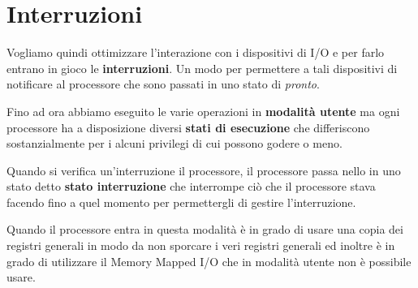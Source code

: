 \section{Interruzioni}
Vogliamo quindi ottimizzare l'interazione con i dispositivi di I/O e per farlo entrano in gioco le
\textbf{interruzioni}. Un modo per permettere a tali dispositivi di notificare al processore che
sono passati in uno stato di \emph{pronto}.

Fino ad ora abbiamo eseguito le varie operazioni in \textbf{modalità utente} ma ogni processore ha
a disposizione diversi \textbf{stati di esecuzione} che differiscono sostanzialmente per i alcuni
privilegi di cui possono godere o meno.

Quando si verifica un'interruzione il processore, il processore passa nello in uno stato detto
\textbf{stato interruzione} che interrompe ciò che il processore stava facendo fino a quel momento
per permettergli di gestire l'interruzione.

Quando il processore entra in questa modalità è in grado di usare una copia dei registri generali
in modo da non sporcare i veri registri generali ed inoltre è in grado di utilizzare il Memory
Mapped I/O che in modalità utente non è possibile usare.

